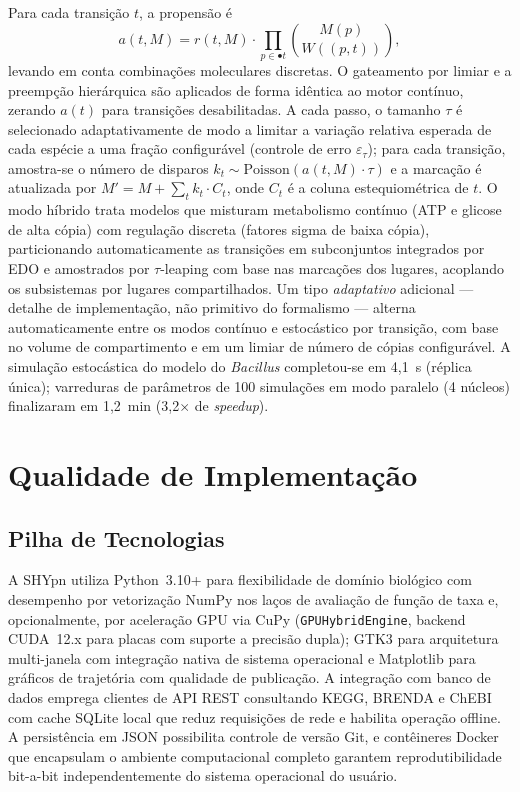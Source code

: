 Para cada transição $t$, a propensão é
\[
  a(t, M) = r(t, M) \cdot \prod_{p \in \bullet t} \binom{M(p)}{W((p,t))},
\]
levando em conta combinações moleculares discretas.
O gateamento por limiar e a preempção hierárquica são aplicados de forma
idêntica ao motor contínuo, zerando $a(t)$ para transições desabilitadas.
A cada passo, o tamanho $\tau$ é selecionado adaptativamente de modo a
limitar a variação relativa esperada de cada espécie a uma fração
configurável (controle de erro $\varepsilon_\tau$); para cada transição,
amostra-se o número de disparos $k_t \sim \mathrm{Poisson}(a(t,M)\cdot\tau)$
e a marcação é atualizada por $M' = M + \sum_t k_t \cdot C_t$, onde $C_t$ é
a coluna estequiométrica de $t$.
O modo híbrido trata modelos que misturam metabolismo contínuo (ATP e glicose
de alta cópia) com regulação discreta (fatores sigma de baixa cópia),
particionando automaticamente as transições em subconjuntos integrados por EDO
e amostrados por $\tau$-leaping com base nas marcações dos lugares, acoplando
os subsistemas por lugares compartilhados.
Um tipo \emph{adaptativo} adicional --- detalhe de implementação, não
primitivo do formalismo --- alterna automaticamente entre os modos contínuo
e estocástico por transição, com base no volume de compartimento e em um
limiar de número de cópias configurável.
A simulação estocástica do modelo do \textit{Bacillus} completou-se em 4,1~s
(réplica única); varreduras de parâmetros de 100 simulações em modo paralelo
(4 núcleos) finalizaram em 1,2~min (3,2$\times$ de \textit{speedup}).

\section{Qualidade de Implementação}
\label{sec:qualidade-implementacao}

\subsection{Pilha de Tecnologias}

A SHYpn utiliza Python~3.10+ para flexibilidade de domínio biológico com
desempenho por vetorização NumPy nos laços de avaliação de função de taxa
e, opcionalmente, por aceleração GPU via CuPy (\texttt{GPUHybridEngine},
backend CUDA~12.x para placas com suporte a precisão dupla);
GTK3 para arquitetura multi-janela com integração nativa de sistema
operacional e Matplotlib para gráficos de trajetória com qualidade de
publicação.
A integração com banco de dados emprega clientes de API REST consultando KEGG,
BRENDA e ChEBI com cache SQLite local que reduz requisições de rede e habilita
operação offline.
A persistência em JSON possibilita controle de versão Git, e contêineres Docker
que encapsulam o ambiente computacional completo garantem reprodutibilidade
bit-a-bit independentemente do sistema operacional do usuário.

